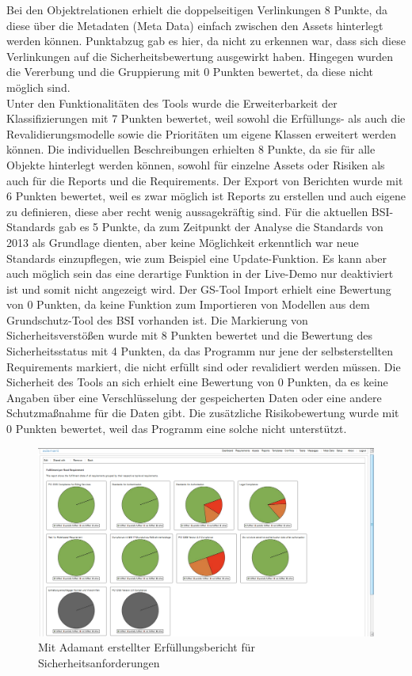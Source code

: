 Bei den Objektrelationen erhielt die doppelseitigen Verlinkungen 8 Punkte, da diese über die Metadaten (Meta Data) einfach zwischen den Assets hinterlegt werden können. Punktabzug gab es hier, da nicht zu erkennen war, dass sich diese Verlinkungen auf die Sicherheitsbewertung ausgewirkt haben. Hingegen wurden die Vererbung und die Gruppierung mit 0 Punkten bewertet, da diese nicht möglich sind.\\
Unter den Funktionalitäten des Tools wurde die Erweiterbarkeit der Klassifizierungen mit 7 Punkten bewertet, weil sowohl die Erfüllungs- als auch die Revalidierungsmodelle sowie die Prioritäten um eigene Klassen erweitert werden können. Die individuellen Beschreibungen erhielten 8 Punkte, da sie für alle Objekte hinterlegt werden können, sowohl für einzelne Assets oder Risiken als auch für die Reports und die Requirements. Der Export von Berichten wurde mit 6 Punkten bewertet, weil es zwar möglich ist Reports zu erstellen und auch eigene zu definieren, diese aber recht wenig aussagekräftig sind. Für die aktuellen BSI-Standards gab es 5 Punkte, da zum Zeitpunkt der Analyse die Standards von 2013 als Grundlage dienten, aber keine Möglichkeit erkenntlich war neue Standards einzupflegen, wie zum Beispiel eine Update-Funktion. Es kann aber auch möglich sein das eine derartige Funktion in der Live-Demo nur deaktiviert ist und somit nicht angezeigt wird. Der GS-Tool Import erhielt eine Bewertung von 0 Punkten, da keine Funktion zum Importieren von Modellen aus dem Grundschutz-Tool des BSI vorhanden ist. Die Markierung von Sicherheitsverstößen wurde mit 8 Punkten bewertet und die Bewertung des Sicherheitsstatus mit 4 Punkten, da das Programm nur jene der selbsterstellten Requirements markiert, die nicht erfüllt sind oder revalidiert werden müssen. Die Sicherheit des Tools an sich erhielt eine Bewertung von 0 Punkten, da es keine Angaben über eine Verschlüsselung der gespeicherten Daten oder eine andere Schutzmaßnahme für die Daten gibt. Die zusätzliche Risikobewertung wurde mit 0 Punkten bewertet, weil das Programm eine solche nicht unterstützt.\\
\begin{figure}[h!bp]
\label{fig:admantReports}
\includegraphics[scale=0.40]{images/adamant_reports.png} 
\caption{Mit Adamant erstellter Erfüllungsbericht für Sicherheitsanforderungen}
\end{figure}

